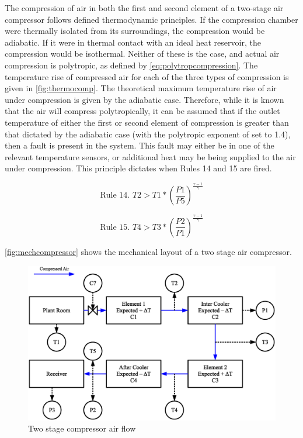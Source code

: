 The compression of air in both the first and second element of a two-stage air compressor follows defined thermodynamic principles. If the compression chamber were thermally isolated from its surroundings, the compression would be adiabatic. If it were in thermal contact with an ideal heat reservoir, the compression would be isothermal. Neither of these is the case, and actual air compression is polytropic, as defined by \autoref{eq:polytropcompression}. The temperature rise of compressed air for each of the three types of compression is given in \autoref{fig:thermocomp}. The theoretical maximum temperature rise of air under compression is given by the adiabatic case. Therefore, while it is known that the air will compress polytropically, it can be assumed that if the outlet temperature of either the first or second element of compression is greater than that dictated by the adiabatic case (with the polytropic exponent of  set to 1.4), then a fault is present in the system. This fault may either be in one of the relevant temperature sensors, or additional heat may be being supplied to the air under compression. This principle dictates when Rules 14 and 15 are fired.

\begin{equation}
\text{Rule 14. } T2 > T1 * \left(\frac{P1}{P5}\right)^\frac{\gamma-1}{\gamma}
\label{eq:rule14}
\end{equation}

\begin{equation}
\text{Rule 15. } T4 > T3 * \left(\frac{P2}{P1}\right)^\frac{\gamma-1}{\gamma}
\label{eq:rule15}
\end{equation}

\lipsum[1-10]

\autoref{fig:mechcompressor} shows the mechanical layout of a two stage air compressor.

\begin{figure}
\includegraphics[width = \textwidth]{./Images/2StageRotaryCompressorIdeal.eps}
\caption{Two stage compressor air flow}
\label{fig:compairflow}
\end{figure}



